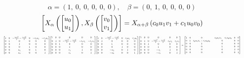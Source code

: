 \documentclass[11pt]{article}
\theoremstyle{definition}
\begin{document}
\[
\alpha = \left( 1, \  0, \  0, \  0, \  0, \  0\right), \quad \beta = \left( 0, \  1, \  0, \  0, \  0, \  0\right)
\]
\[
\scaletoalign{\textwidth}{\left[ X_{\alpha}\left(\left[\begin{matrix}u_{0}\\u_{1}\end{matrix}\right]\right), X_{\beta}\left(\left[\begin{matrix}v_{0}\\v_{1}\end{matrix}\right]\right) \right] = X_{\alpha + \beta}\left(c_{0} u_{1} v_{1} + c_{1} u_{0} v_{0}\right)}
\]
\[
\scaletoalign{\textwidth}{{\left[\begin{matrix}1 & 0 & - \frac{c_{0} u_{1}^{2}}{2} - \frac{c_{1} u_{0}^{2}}{2} & 0 & - c_{0} u_{1} & - c_{1} u_{0}\\0 & 1 & 0 & 0 & 0 & 0\\0 & 0 & 1 & 0 & 0 & 0\\0 & 0 & 0 & 1 & 0 & 0\\0 & 0 & u_{1} & 0 & 1 & 0\\0 & 0 & u_{0} & 0 & 0 & 1\end{matrix}\right]} {\left[\begin{matrix}1 & 0 & 0 & 0 & 0 & 0\\0 & 1 & 0 & - \frac{c_{0} v_{1}^{2}}{2} - \frac{c_{1} v_{0}^{2}}{2} & - c_{0} v_{1} & - c_{1} v_{0}\\0 & 0 & 1 & 0 & 0 & 0\\0 & 0 & 0 & 1 & 0 & 0\\0 & 0 & 0 & v_{1} & 1 & 0\\0 & 0 & 0 & v_{0} & 0 & 1\end{matrix}\right]} {\left[\begin{matrix}1 & 0 & - \frac{c_{0} u_{1}^{2}}{2} - \frac{c_{1} u_{0}^{2}}{2} & 0 & c_{0} u_{1} & c_{1} u_{0}\\0 & 1 & 0 & 0 & 0 & 0\\0 & 0 & 1 & 0 & 0 & 0\\0 & 0 & 0 & 1 & 0 & 0\\0 & 0 & - u_{1} & 0 & 1 & 0\\0 & 0 & - u_{0} & 0 & 0 & 1\end{matrix}\right]} {\left[\begin{matrix}1 & 0 & 0 & 0 & 0 & 0\\0 & 1 & 0 & - \frac{c_{0} v_{1}^{2}}{2} - \frac{c_{1} v_{0}^{2}}{2} & c_{0} v_{1} & c_{1} v_{0}\\0 & 0 & 1 & 0 & 0 & 0\\0 & 0 & 0 & 1 & 0 & 0\\0 & 0 & 0 & - v_{1} & 1 & 0\\0 & 0 & 0 & - v_{0} & 0 & 1\end{matrix}\right]} = {\left[\begin{matrix}1 & 0 & 0 & - c_{0} u_{1} v_{1} - c_{1} u_{0} v_{0} & 0 & 0\\0 & 1 & c_{0} u_{1} v_{1} + c_{1} u_{0} v_{0} & 0 & 0 & 0\\0 & 0 & 1 & 0 & 0 & 0\\0 & 0 & 0 & 1 & 0 & 0\\0 & 0 & 0 & 0 & 1 & 0\\0 & 0 & 0 & 0 & 0 & 1\end{matrix}\right]}}
\]
\end{document}
